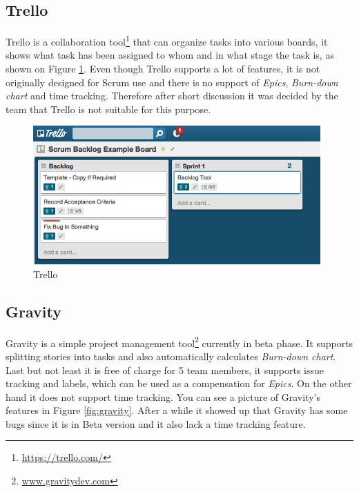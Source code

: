 \subsection{Trello}
\label{subsec:TrelloToolDescription}
Trello is a collaboration tool\footnote{\url{https://trello.com/}} that can organize tasks into various boards, it shows what task has been assigned to whom and in what stage the task is, as shown on Figure \ref{fig:trello}.
Even though Trello supports a lot of features, it is not originally designed for Scrum use and there is no support of \emph{Epics}, \emph{Burn-down chart} and time tracking. 
Therefore after short discussion it was decided by the team that Trello is not suitable for this purpose.
\begin{figure}[H]
    \centering
        \includegraphics[width=11cm]{preliminaryStudies/trello.png}
    \caption{Trello}
    \label{fig:trello}
\end{figure}

\subsection{Gravity} 
\label{subsec:GravityToolDescription}
Gravity is a simple project management tool\footnote{\url{www.gravitydev.com}} currently in beta phase.
It supports splitting stories into tasks and also automatically calculates \emph{Burn-down chart}. 
Last but not least it is free of charge for 5 team members, it supports issue tracking and labels, which can be used as a compensation for \emph{Epics}.
On the other hand it does not support time tracking.
You can see a picture of Gravity's features in Figure \ref{fig:gravity}. After a while it showed up that Gravity has some bugs since it is in Beta version and it also lack a time tracking feature.

